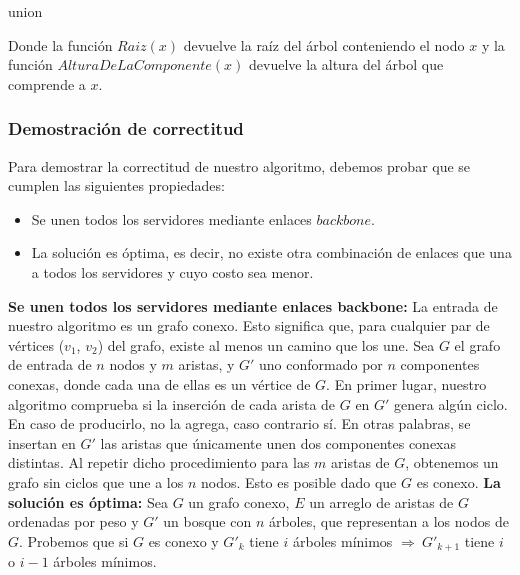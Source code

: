 \begin{itemize}
\begin{algorithm}[H]
	\SetAlgoLined
	\caption{union}
\end{algorithm}

Donde la función $Raiz(x)$ devuelve la raíz del árbol conteniendo el nodo $x$ y la función $AlturaDeLaComponente(x)$ devuelve la altura del árbol que comprende a $x$.

\subsubsection{Demostración de correctitud}

Para demostrar la correctitud de nuestro algoritmo, debemos probar que se cumplen las siguientes propiedades:
\begin{itemize}
\item Se unen todos los servidores mediante enlaces $backbone$.
\item La solución es óptima, es decir, no existe otra combinación de enlaces que una a todos los servidores y cuyo costo sea menor.
\end{itemize}

\newline

\textbf{Se unen todos los servidores mediante enlaces backbone:} \newline
\newline
La entrada de nuestro algoritmo es un grafo conexo. Esto significa que, para cualquier par de vértices ($v_{1}$, $v_{2}$) del grafo, existe al menos un camino que los une. \newline  
\newline
Sea $G$ el grafo de entrada de $n$ nodos y $m$ aristas, y $G'$ uno conformado por $n$ componentes conexas, donde cada una de ellas es un vértice de $G$.
En primer lugar, nuestro algoritmo comprueba si la inserción de cada arista de $G$ en $G'$ genera algún ciclo. En caso de producirlo, no la agrega, caso contrario sí. En otras palabras, se insertan en $G'$ las aristas que únicamente unen dos componentes conexas distintas. Al repetir dicho procedimiento para las $m$ aristas de $G$, obtenemos un grafo sin ciclos que une a los $n$ nodos. Esto es posible dado que $G$ es conexo.
\newline
\newline
\textbf{La solución es óptima:} \newline
\newline
Sea $G$ un grafo conexo, $E$ un arreglo de aristas de $G$ ordenadas por peso y $G'$ un bosque con $n$ árboles, que representan a los nodos de $G$. 
Probemos que si $G$ es conexo y $G'_{k}$ tiene $i$ árboles mínimos $\Rightarrow\ G'_{k+1}$ tiene $i$ o $i-1$ árboles mínimos.\newline


\end{itemize}
